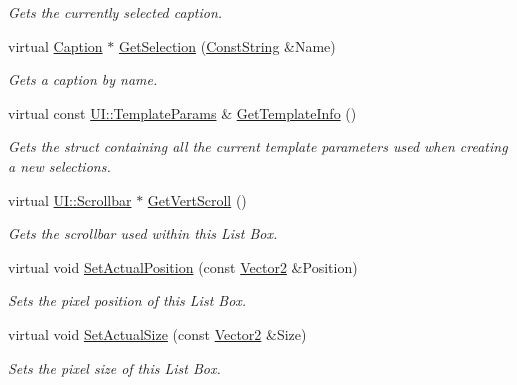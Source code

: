 \begin{DoxyCompactItemize}
\begin{DoxyCompactList}\small\item\em Gets the currently selected caption. \item\end{DoxyCompactList}\item 
virtual \hyperlink{classMezzanine_1_1UI_1_1Caption}{Caption} $\ast$ \hyperlink{classMezzanine_1_1UI_1_1ListBox_a793bd0f547a9f87ea74eb4204d591506}{GetSelection} (\hyperlink{namespaceMezzanine_a63cd699ac54b73953f35ec9cfc05e506}{ConstString} \&Name)
\begin{DoxyCompactList}\small\item\em Gets a caption by name. \item\end{DoxyCompactList}\item 
virtual const \hyperlink{structMezzanine_1_1UI_1_1TemplateParams}{UI::TemplateParams} \& \hyperlink{classMezzanine_1_1UI_1_1ListBox_a65730a3d35fdddea0499d90991a31bcc}{GetTemplateInfo} ()
\begin{DoxyCompactList}\small\item\em Gets the struct containing all the current template parameters used when creating a new selections. \item\end{DoxyCompactList}\item 
virtual \hyperlink{classMezzanine_1_1UI_1_1Scrollbar}{UI::Scrollbar} $\ast$ \hyperlink{classMezzanine_1_1UI_1_1ListBox_a68873b3f128512572564ef11e9b48309}{GetVertScroll} ()
\begin{DoxyCompactList}\small\item\em Gets the scrollbar used within this List Box. \item\end{DoxyCompactList}\item 
virtual void \hyperlink{classMezzanine_1_1UI_1_1ListBox_a0bf39153416d2010e5bf36601873c73e}{SetActualPosition} (const \hyperlink{classMezzanine_1_1Vector2}{Vector2} \&Position)
\begin{DoxyCompactList}\small\item\em Sets the pixel position of this List Box. \item\end{DoxyCompactList}\item 
virtual void \hyperlink{classMezzanine_1_1UI_1_1ListBox_ad277b2268dd5439c05ce300addf31815}{SetActualSize} (const \hyperlink{classMezzanine_1_1Vector2}{Vector2} \&Size)
\begin{DoxyCompactList}\small\item\em Sets the pixel size of this List Box. \item\end{DoxyCompactList}\item 

\end{DoxyCompactItemize}
